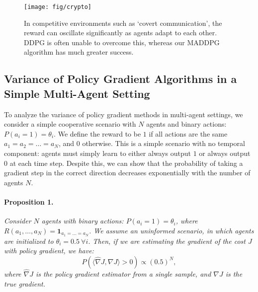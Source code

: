 \documentclass{article}
\newtheorem{prop}{Proposition}
\begin{document}
\iffalse
\begin{figure}
\centering
\texttt{[image: fig/speak\_list\_succ2]}
\caption{\label{fig:speak_list_succ2} The success rate of MADDPG against traditional RL approaches on cooperative communication. RL algorithms are super-imposed on the success=0 line.  \vspace{-4mm}}
\end{figure}
\fi

\begin{figure}
\centering
\texttt{[image: fig/crypto]}
\caption{\label{fig:crypto} In competitive environments such as `covert communication', the reward can oscillate significantly as agents adapt to each other. DDPG is often unable to overcome this, whereas our MADDPG algorithm has much greater success. \vspace{-3mm}}
\end{figure}

\newpage

\subsection*{Variance of Policy Gradient Algorithms in a Simple Multi-Agent Setting}
\label{sec:variance}
To analyze the variance of policy gradient methods in multi-agent settings, we consider a simple cooperative scenario with $N$ agents and binary actions: $P(a_i=1) = \theta_i$. We define the reward to be $1$ if all actions are the same $a_1=a_2=\ldots=a_N$, and $0$ otherwise. This is a simple scenario with no temporal component: agents must simply learn to either always output $1$ or always output $0$ at each time step. Despite this, we can show that the probability of taking a gradient step in the correct direction decreases exponentially with the number of agents $N$.

\paragraph{Proposition 1.}
\textit{
Consider $N$ agents with binary actions: $P(a_i=1) = \theta_i$, where $R(a_1,\dots,a_N) = \mathbf{1}_{a_1=\dots=a_N}$. We assume an uninformed scenario, in which agents are initialized to $\theta_i=0.5 \ \forall i$. Then, if we are estimating the gradient of the cost $J$ with policy gradient, we have:
$$P(\langle \hat{\nabla} J, \nabla J \rangle > 0) \propto (0.5)^N,$$
where $\hat{\nabla} J$ is the policy gradient estimator from a single sample, and $\nabla J$ is the true gradient.
}
\end{document}
